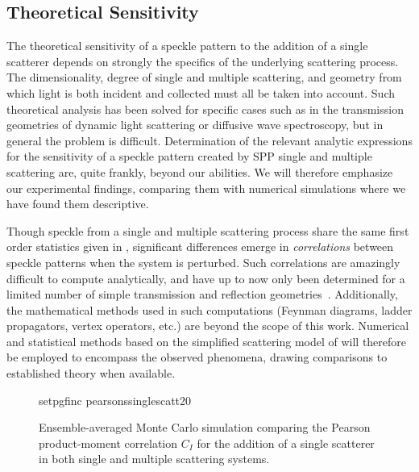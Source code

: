 \subsection{Theoretical Sensitivity}
The theoretical sensitivity of a speckle pattern to the addition of a
single scatterer depends on strongly the specifics of the underlying
scattering process.  The dimensionality, degree of single and multiple
scattering, and geometry from which light is both incident and collected
must all be taken into account.  Such theoretical analysis has been solved
for specific cases such as in the transmission geometries of dynamic light
scattering or diffusive wave spectroscopy, but in general the problem is
difficult.  Determination of the relevant analytic expressions for the
sensitivity of a speckle pattern created by SPP single and multiple
scattering are, quite frankly, beyond our abilities.  We will therefore
emphasize our experimental findings, comparing them with numerical
simulations where we have found them descriptive.

Though speckle from a single and multiple scattering process share the same
first order statistics given in , significant differences
emerge in \textit{correlations} between speckle patterns when the system is
perturbed.  Such correlations are amazingly difficult to compute analytically,
and have up to now only been determined for a limited number of simple
transmission and reflection geometries~\cite{berkovits1994correlations}.
Additionally, the mathematical methods used in such computations (Feynman
diagrams, ladder propagators, vertex operators, etc.) are beyond the scope of
this work.  Numerical and statistical methods based on the simplified
scattering model of  will therefore be employed
to encompass the observed phenomena, drawing comparisons to established theory
when available.

\begin{figure}
\centering
{setpgfinc}
{pearsonssinglescatt20}
\caption{Ensemble-averaged Monte Carlo simulation comparing the Pearson
product-moment correlation $C_I$ for the addition of a single scatterer in
both single and multiple scattering systems.}
\label{fig:scatteringpearson}
\end{figure}

